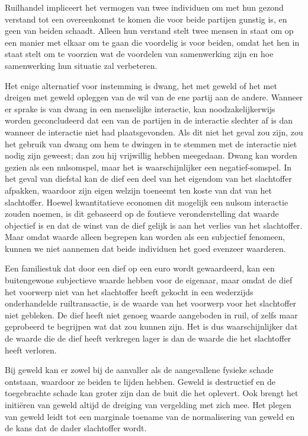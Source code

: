 \documentclass[
  a5paper,
  smalldemyvopaper,11pt,twoside,onecolumn,openright,extrafontsizes,
hidelinks]{memoir}
\begin{document}
Ruilhandel impliceert het vermogen van twee individuen om met hun gezond
verstand tot een overeenkomst te komen die voor beide partijen gunstig
is, en geen van beiden schaadt. Alleen hun verstand stelt twee mensen in
staat om op een manier met elkaar om te gaan die voordelig is voor
beiden, omdat het hen in staat stelt om te voorzien wat de voordelen van
samenwerking zijn en hoe samenwerking hun situatie zal verbeteren.

Het enige alternatief voor instemming is dwang, het met geweld of het
met dreigen met geweld opleggen van de wil van de ene partij aan de
andere. Wanneer er sprake is van dwang in een menselijke interactie, kan
noodzakelijkerwijs worden geconcludeerd dat een van de partijen in de
interactie slechter af is dan wanneer de interactie niet had
plaatsgevonden. Als dit niet het geval zou zijn, zou het gebruik van
dwang om hem te dwingen in te stemmen met de interactie niet nodig zijn
geweest; dan zou hij vrijwillig hebben meegedaan. Dwang kan worden
gezien als een nulsomspel, maar het is waarschijnlijker een
negatief-somspel. In het geval van diefstal kan de dief een deel van het
eigendom van het slachtoffer afpakken, waardoor zijn eigen welzijn
toeneemt ten koste van dat van het slachtoffer. Hoewel kwantitatieve
economen dit mogelijk een nulsom interactie zouden noemen, is dit
gebaseerd op de foutieve veronderstelling dat waarde objectief is en dat
de winst van de dief gelijk is aan het verlies van het slachtoffer. Maar
omdat waarde alleen begrepen kan worden als een subjectief fenomeen,
kunnen we niet aannemen dat beide individuen het goed evenzeer
waarderen.

Een familiestuk dat door een dief op een euro wordt gewaardeerd, kan een
buitengewone subjectieve waarde hebben voor de eigenaar, maar omdat de
dief het voorwerp niet van het slachtoffer heeft gekocht in een
wederzijds onderhandelde ruiltransactie, is de waarde van het voorwerp
voor het slachtoffer niet gebleken. De dief heeft niet genoeg waarde
aangeboden in ruil, of zelfs maar geprobeerd te begrijpen wat dat zou
kunnen zijn. Het is dus waarschijnlijker dat de waarde die de dief heeft
verkregen lager is dan de waarde die het slachtoffer heeft verloren.

Bij geweld kan er zowel bij de aanvaller als de aangevallene fysieke
schade ontstaan, waardoor ze beiden te lijden hebben. Geweld is
destructief en de toegebrachte schade kan groter zijn dan de buit die
het oplevert. Ook brengt het initiëren van geweld altijd de dreiging van
vergelding met zich mee. Het plegen van geweld leidt tot een marginale
toename van de normalisering van geweld en de kans dat de dader
slachtoffer wordt.
\end{document}
